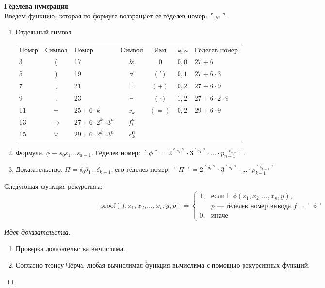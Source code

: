 \textbf{Гёделева нумерация}\\
Введем функцию, которая по формуле возвращает ее гёделев номер: $\ulcorner\varphi \urcorner$.
\begin{enumerate}
\item Отдельный символ.

\begin{tabular}{lc|lc||cll}
Номер & Символ & Номер & Символ & Имя & $k,n$ & Гёделев номер\\
3 & ( &               17 & $\&$ &  0 & $0,0$ & $27 + 6$\\
5 & ) &               19 & $\forall$ & $(')$ & $0,1$ & $27 + 6 \cdot 3$\\
7 & , &               21 & $\exists$ & $(+)$ & $0,2$ & $27 + 6 \cdot 9$\\
9 & . &               23 & $\vdash$ & $(\cdot)$ & $1,2$ & $27 + 6 \cdot 2 \cdot 9$\\
11 & $\neg$ &         $25 + 6\cdot k$ & $x_k$ & $(=)$ & $0,2$ & $29 + 6 \cdot 9$\\
13 & $\rightarrow$ &  $27 + 6\cdot 2^k \cdot 3^n$ & $f_k^n$\\
15 & $\vee$ &         $29 + 6\cdot 2^k \cdot 3^n$ & $P_k^n$
\end{tabular}

\item Формула. $\phi \equiv s_0s_1\dots s_{n-1}$. Гёделев номер: $\ulcorner\phi\urcorner = 2^{\ulcorner s_0\urcorner}\cdot 3^{\ulcorner s_1\urcorner}
\cdot \dots \cdot p_{n-1}^{\ulcorner s_{n-1}\urcorner}$.

\item Доказательство. $\Pi = \delta_0\delta_1\dots\delta_{k-1}$, его гёделев номер: $\ulcorner\Pi\urcorner =
2^{\ulcorner \delta_0\urcorner}\cdot 3^{\ulcorner \delta_1\urcorner} \cdot \dots \cdot p_{k-1}^{\ulcorner \delta_{k-1}\urcorner}$
\end{enumerate}


\begin{theorem}
    Следующая функция рекурсивна:
$$\text{proof}(f,x_1,x_2,\dots,x_n,y,p) = \left\{\begin{array}{ll}
1, & \mbox{если} \vdash\phi(\overline{x_1},\overline{x_2},\dots,\overline{x_n},\overline{y}),\\
   & p \mbox{ --- гёделев номер вывода}, f = \ulcorner\phi\urcorner \\
0, & \mbox{иначе}
\end{array}\right.$$\vspace{-0.1cm}
\end{theorem}
\begin{proof}[Идея доказательства]
\begin{enumerate}
\item Проверка доказательства вычислима.
\item Согласно тезису Чёрча, любая вычислимая функция
вычислима с помощью рекурсивных функций.
\end{enumerate}
\end{proof}

